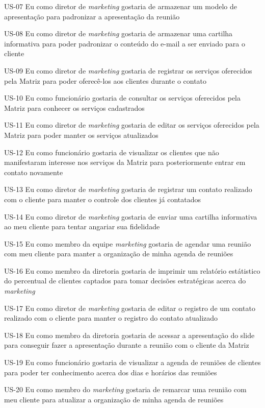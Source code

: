 US-07 Eu como diretor de \textit{marketing} gostaria de armazenar um modelo de apresentação para padronizar a apresentação da reunião


US-08 Eu como diretor de \textit{marketing} gostaria de armazenar uma cartilha informativa para poder padronizar o conteúdo do e-mail a ser enviado para o cliente


US-09 Eu como diretor de \textit{marketing} gostaria de registrar os serviços oferecidos pela Matriz para poder oferecê-los aos clientes durante o contato


US-10 Eu como funcionário gostaria de consultar os serviços oferecidos pela Matriz para conhecer os serviços cadastrados


US-11 Eu como diretor de \textit{marketing} gostaria de editar os serviços oferecidos pela Matriz para poder manter os serviços atualizados


US-12 Eu como funcionário gostaria de visualizar os clientes que não manifestaram interesse nos serviços da Matriz para posteriormente entrar em contato novamente


US-13 Eu como diretor de \textit{marketing} gostaria de registrar um contato realizado com o cliente para manter o controle dos clientes já contatados


US-14 Eu como diretor de \textit{marketing} gostaria de enviar uma cartilha informativa ao meu cliente para tentar angariar sua fidelidade


US-15 Eu como membro da equipe \textit{marketing} gostaria de agendar uma reunião com meu cliente para manter a organização de minha agenda de reuniões


US-16 Eu como membro da diretoria gostaria de imprimir um relatório estátistico do percentual de clientes captados para tomar decisões estratégicas acerca do \textit{marketing}


US-17 Eu como diretor de \textit{marketing} gostaria de editar o registro de um contato realizado com o cliente para manter o registro do contato atualizado


US-18 Eu como membro da diretoria gostaria de acessar a apresentação do slide para conseguir fazer a apresentação durante a reunião com o cliente da Matriz


US-19 Eu como funcionário gostaria de visualizar a agenda de reuniões de clientes para poder ter conhecimento acerca dos dias e horários das reuniões


US-20 Eu como membro do \textit{marketing} gostaria de remarcar uma reunião com meu cliente para atualizar a organização de minha agenda de reuniões


